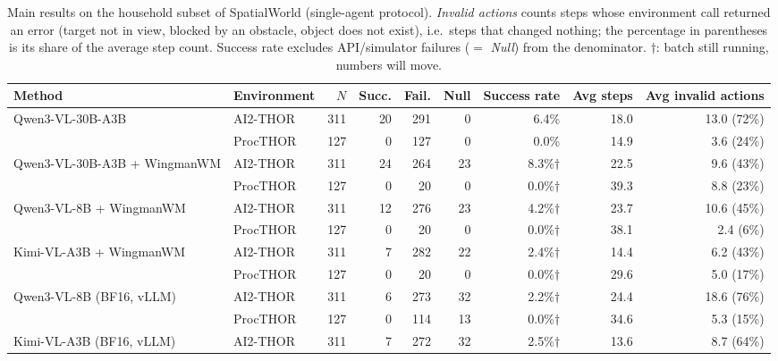 \documentclass[10pt]{article}
\begin{document}
\begin{table}[t]
  \centering
  \caption{Main results on the household subset of SpatialWorld (single-agent protocol). \emph{Invalid actions} counts steps whose environment call returned an error (target not in view, blocked by an obstacle, object does not exist), i.e.\ steps that changed nothing; the percentage in parentheses is its share of the average step count. Success rate excludes API/simulator failures ($=$ \emph{Null}) from the denominator. $\dagger$: batch still running, numbers will move.}
  \label{tab:main-results}
  \small
  \setlength{\tabcolsep}{4pt}
  \begin{tabular}{llrrrrrrr}
    \toprule
    Method & Environment & $N$ & Succ. & Fail. & Null & Success rate & Avg steps & Avg invalid actions \\
    \midrule
    \multirow{2}{*}{Qwen3-VL-30B-A3B} & AI2-THOR & 311 & 20 & 291 & 0 & 6.4\% & 18.0 & 13.0 (72\%) \\
     & ProcTHOR & 127 & 0 & 127 & 0 & 0.0\% & 14.9 & 3.6 (24\%) \\
    \cmidrule(l){1-9}
    \multirow{2}{*}{Qwen3-VL-30B-A3B + WingmanWM} & AI2-THOR & 311 & 24 & 264 & 23 & 8.3\%$\dagger$ & 22.5 & 9.6 (43\%) \\
     & ProcTHOR & 127 & 0 & 20 & 0 & 0.0\%$\dagger$ & 39.3 & 8.8 (23\%) \\
    \cmidrule(l){1-9}
    \multirow{2}{*}{Qwen3-VL-8B + WingmanWM} & AI2-THOR & 311 & 12 & 276 & 23 & 4.2\%$\dagger$ & 23.7 & 10.6 (45\%) \\
     & ProcTHOR & 127 & 0 & 20 & 0 & 0.0\%$\dagger$ & 38.1 & 2.4 (6\%) \\
    \cmidrule(l){1-9}
    \multirow{2}{*}{Kimi-VL-A3B + WingmanWM} & AI2-THOR & 311 & 7 & 282 & 22 & 2.4\%$\dagger$ & 14.4 & 6.2 (43\%) \\
     & ProcTHOR & 127 & 0 & 20 & 0 & 0.0\%$\dagger$ & 29.6 & 5.0 (17\%) \\
    \cmidrule(l){1-9}
    \multirow{2}{*}{Qwen3-VL-8B (BF16, vLLM)} & AI2-THOR & 311 & 6 & 273 & 32 & 2.2\%$\dagger$ & 24.4 & 18.6 (76\%) \\
     & ProcTHOR & 127 & 0 & 114 & 13 & 0.0\%$\dagger$ & 34.6 & 5.3 (15\%) \\
    \cmidrule(l){1-9}
    \multirow{2}{*}{Kimi-VL-A3B (BF16, vLLM)} & AI2-THOR & 311 & 7 & 272 & 32 & 2.5\%$\dagger$ & 13.6 & 8.7 (64\%) \\

\end{tabular}
\end{table}
\end{document}
